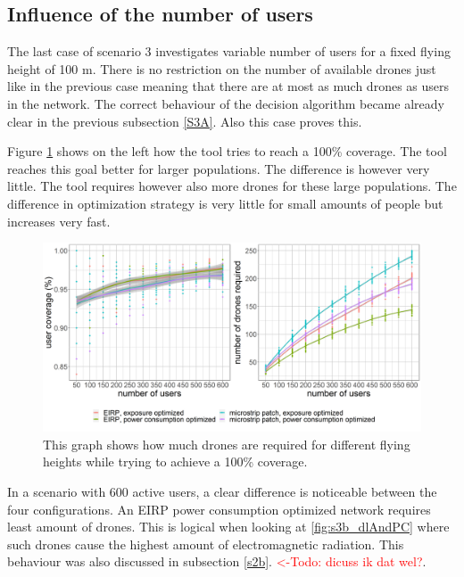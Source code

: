 \FloatBarrier
\subsection{Influence of the number of users}
\label{S3B}

The last case of scenario 3 investigates variable number of users for a fixed flying height of 100 m. There is no 
restriction on the number of available drones just like in the previous case meaning that there are at most 
as much drones as users in the network. The correct behaviour of the decision algorithm became already clear in the previous subsection \ref{S3A}. 
Also this case proves this.

Figure \ref{fig:s3b_numDronesAndCov} shows on the left how the tool tries to reach a 100\% coverage. The tool reaches this goal 
better for larger populations. The difference is however very little. The tool requires however also more drones for these large 
populations. The difference in optimization strategy is very little for small amounts of people but increases very fast. 

\begin{figure}[h!]
  \includegraphics[width=\textwidth]{../results/s3/uvsnumdronesAndCov.png}
  \caption{This graph shows how much drones are required for different flying heights while trying to achieve a 100\% coverage.}
  \label{fig:s3b_numDronesAndCov}
\end{figure}

In a scenario with 600 active users, a clear difference is noticeable between the four configurations. An EIRP power consumption optimized 
network requires least amount of drones. This is logical when looking at \ref{fig:s3b_dlAndPC} where such drones cause the highest amount of 
electromagnetic radiation. This behaviour was also discussed in subsection \ref{s2b}. \textcolor{red}{<-Todo: dicuss ik dat wel?}.

